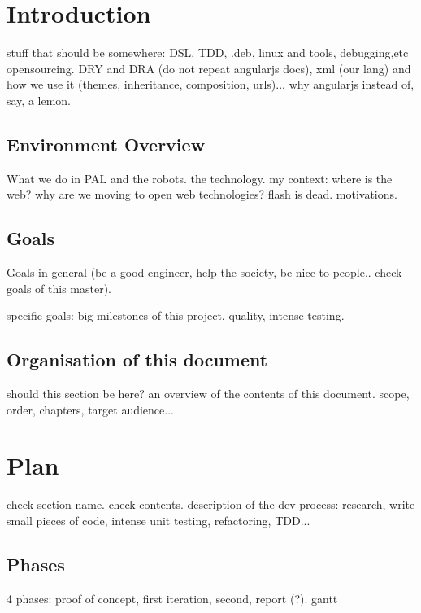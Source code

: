 \chapter{Introduction}
stuff that should be somewhere: DSL, TDD, .deb, linux and tools, debugging,etc opensourcing. DRY and DRA (do not repeat angularjs docs), xml (our lang) and how we use it (themes, inheritance, composition, urls)...
why angularjs instead of, say, a lemon.

\section{Environment Overview}
What we do in PAL and the robots. the technology. my context: where is the web? why are we moving to open web technologies? flash is dead. motivations.

\section{Goals}
Goals in general (be a good engineer, help the society, be nice to people.. check goals of this master).

specific goals: big milestones of this project. quality, intense testing. 

\section{Organisation of this document}
should this section be here? an overview of the contents of this document. scope, order, chapters, target audience...

\chapter{Plan}
check section name. check contents.
description of the dev process: research, write small pieces of code, intense unit testing, refactoring, TDD...

\section{Phases}
4 phases: proof of concept, first iteration, second, report (?). gantt
